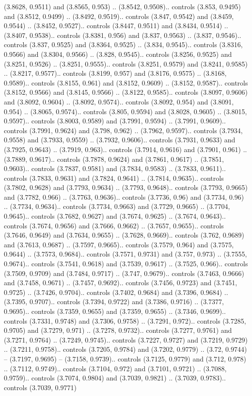 (3.8628, 0.9511) and (3.8565, 0.953) .. (3.8542, 0.9508).. controls (3.853, 0.9495) and (3.8512, 0.9499) .. (3.8492, 0.9519).. controls (3.847, 0.9542) and (3.8459, 0.9544) .. (3.8452, 0.9527).. controls (3.8447, 0.9511) and (3.8434, 0.9514) .. (3.8407, 0.9538).. controls (3.8381, 0.956) and (3.837, 0.9563) .. (3.837, 0.9546).. controls (3.837, 0.9525) and (3.8364, 0.9525) .. (3.834, 0.9545).. controls (3.8316, 0.9566) and (3.8304, 0.9566) .. (3.828, 0.9545).. controls (3.8256, 0.9525) and (3.8251, 0.9526) .. (3.8251, 0.9555).. controls (3.8251, 0.9579) and (3.8241, 0.9585) .. (3.8217, 0.9577).. controls (3.8199, 0.957) and (3.8176, 0.9575) .. (3.8168, 0.9589).. controls (3.8155, 0.961) and (3.8152, 0.9609) .. (3.8152, 0.9587).. controls (3.8152, 0.9566) and (3.8145, 0.9566) .. (3.8122, 0.9585).. controls (3.8097, 0.9606) and (3.8092, 0.9604) .. (3.8092, 0.9574).. controls (3.8092, 0.954) and (3.8091, 0.954) .. (3.8065, 0.9574).. controls (3.805, 0.9594) and (3.8028, 0.9605) .. (3.8015, 0.9597).. controls (3.8003, 0.9589) and (3.7991, 0.9594) .. (3.7991, 0.9609).. controls (3.7991, 0.9624) and (3.798, 0.962) .. (3.7962, 0.9597).. controls (3.7934, 0.9558) and (3.7933, 0.9559) .. (3.7932, 0.9606).. controls (3.7931, 0.9633) and (3.7925, 0.9643) .. (3.7919, 0.963).. controls (3.7914, 0.9616) and (3.7901, 0.961) .. (3.7889, 0.9617).. controls (3.7878, 0.9624) and (3.7861, 0.9617) .. (3.7851, 0.9603).. controls (3.7837, 0.9581) and (3.7834, 0.9583) .. (3.7833, 0.9611).. controls (3.7833, 0.9631) and (3.7824, 0.9641) .. (3.7814, 0.9635).. controls (3.7802, 0.9628) and (3.7793, 0.9634) .. (3.7793, 0.9648).. controls (3.7793, 0.9665) and (3.7782, 0.966) .. (3.7763, 0.9636).. controls (3.7736, 0.96) and (3.7734, 0.96) .. (3.7734, 0.9634).. controls (3.7734, 0.9663) and (3.7729, 0.9665) .. (3.7704, 0.9645).. controls (3.7682, 0.9627) and (3.7674, 0.9625) .. (3.7674, 0.9643).. controls (3.7674, 0.9656) and (3.7666, 0.9662) .. (3.7657, 0.9655).. controls (3.7646, 0.9649) and (3.7634, 0.9655) .. (3.7628, 0.9669).. controls (3.762, 0.9689) and (3.7613, 0.9687) .. (3.7597, 0.9665).. controls (3.7579, 0.964) and (3.7575, 0.9644) .. (3.7573, 0.9684).. controls (3.7571, 0.9731) and (3.757, 0.973) .. (3.7555, 0.9674).. controls (3.7541, 0.9618) and (3.7539, 0.9617) .. (3.7525, 0.966).. controls (3.7509, 0.9709) and (3.7484, 0.9717) .. (3.747, 0.9679).. controls (3.7463, 0.9666) and (3.7458, 0.9671) .. (3.7457, 0.9692).. controls (3.7456, 0.9723) and (3.7451, 0.9725) .. (3.7426, 0.9704).. controls (3.7402, 0.9684) and (3.7396, 0.9684) .. (3.7395, 0.9707).. controls (3.7394, 0.9722) and (3.7386, 0.9716) .. (3.7377, 0.9695).. controls (3.7359, 0.9655) and (3.7359, 0.9655) .. (3.7346, 0.9699).. controls (3.7331, 0.9748) and (3.7306, 0.9758) .. (3.7291, 0.972).. controls (3.7285, 0.9705) and (3.7279, 0.971) .. (3.7278, 0.9732).. controls (3.7277, 0.9761) and (3.7271, 0.9764) .. (3.7249, 0.9745).. controls (3.7227, 0.9727) and (3.7219, 0.9729) .. (3.7211, 0.9758).. controls (3.7205, 0.9784) and (3.7202, 0.9779) .. (3.72, 0.9744) -- (3.7197, 0.9695) -- (3.7158, 0.9739).. controls (3.7125, 0.9779) and (3.712, 0.978) .. (3.7112, 0.9749).. controls (3.7104, 0.972) and (3.7101, 0.9721) .. (3.7088, 0.9759).. controls (3.7074, 0.9804) and (3.7039, 0.9821) .. (3.7039, 0.9783).. controls (3.7039, 0.9771) 